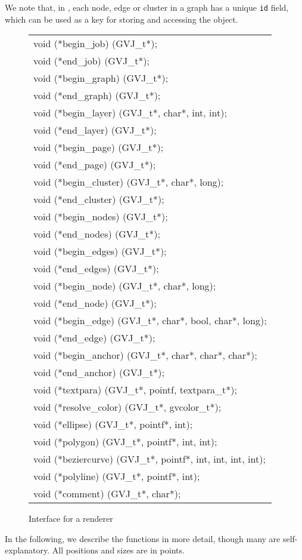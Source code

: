 We note that, in \gviz, each node, edge or cluster in a graph 
has a unique {\tt id}
field, which can be used as a key for storing and accessing the object.

\begin{figure*}[htb]
\centering
\begin{tabular}{|l|} \hline
void (*begin\_job) (GVJ\_t*);  \\
void (*end\_job) (GVJ\_t*); \\
void (*begin\_graph) (GVJ\_t*); \\
void (*end\_graph) (GVJ\_t*); \\
void (*begin\_layer) (GVJ\_t*, char*, int, int); \\
void (*end\_layer) (GVJ\_t*); \\
void (*begin\_page) (GVJ\_t*); \\
void (*end\_page) (GVJ\_t*); \\
void (*begin\_cluster) (GVJ\_t*, char*, long); \\
void (*end\_cluster) (GVJ\_t*); \\
void (*begin\_nodes) (GVJ\_t*); \\
void (*end\_nodes) (GVJ\_t*); \\
void (*begin\_edges) (GVJ\_t*); \\
void (*end\_edges) (GVJ\_t*); \\
void (*begin\_node) (GVJ\_t*, char*, long); \\
void (*end\_node) (GVJ\_t*); \\
void (*begin\_edge) (GVJ\_t*, char*, bool, char*, long); \\
void (*end\_edge) (GVJ\_t*); \\
void (*begin\_anchor) (GVJ\_t*, char*, char*, char*); \\
void (*end\_anchor) (GVJ\_t*); \\
void (*textpara) (GVJ\_t*, pointf, textpara\_t*); \\
void (*resolve\_color) (GVJ\_t*, gvcolor\_t*); \\
void (*ellipse) (GVJ\_t*, pointf*, int); \\
void (*polygon) (GVJ\_t*, pointf*, int, int); \\
void (*beziercurve) (GVJ\_t*, pointf*, int, int, int, int); \\
void (*polyline) (GVJ\_t*, pointf*, int); \\
void (*comment) (GVJ\_t*, char*); \\ \hline
\end{tabular}
\caption{Interface for a renderer}
\label{fig:codegen}
\end{figure*}
In the following, we describe the functions in more detail, though
many are self-explanatory. 
All positions and sizes are in points.

